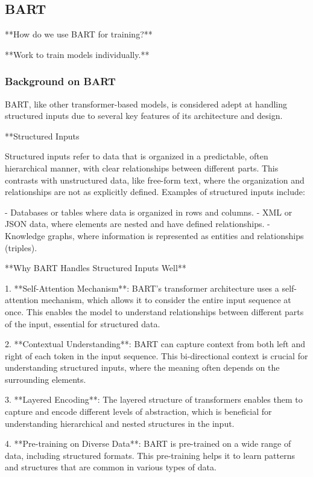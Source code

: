 \subsection*{BART}
**How do we use BART for training?**

**Work to train models individually.**
\subsubsection{Background on BART}
BART, like other transformer-based models, is considered adept at handling structured inputs due to several key features of its architecture and design.

**Structured Inputs

Structured inputs refer to data that is organized in a predictable, often hierarchical manner, with clear relationships between different parts. This contrasts with unstructured data, like free-form text, where the organization and relationships are not as explicitly defined. Examples of structured inputs include:

- Databases or tables where data is organized in rows and columns.
- XML or JSON data, where elements are nested and have defined relationships.
- Knowledge graphs, where information is represented as entities and relationships (triples).

**Why BART Handles Structured Inputs Well**

1. **Self-Attention Mechanism**: BART's transformer architecture uses a self-attention mechanism, which allows it to consider the entire input sequence at once. This enables the model to understand relationships between different parts of the input, essential for structured data.

2. **Contextual Understanding**: BART can capture context from both left and right of each token in the input sequence. This bi-directional context is crucial for understanding structured inputs, where the meaning often depends on the surrounding elements.

3. **Layered Encoding**: The layered structure of transformers enables them to capture and encode different levels of abstraction, which is beneficial for understanding hierarchical and nested structures in the input.

4. **Pre-training on Diverse Data**: BART is pre-trained on a wide range of data, including structured formats. This pre-training helps it to learn patterns and structures that are common in various types of data.

